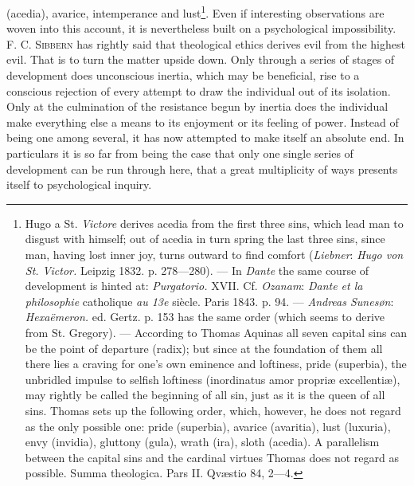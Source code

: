 \documentclass[12pt,a4paper,openany]{book}
\newcommand{\opage}[1]{\marginnote{\footnotesize\textit{[#1]}}}
\begin{document}
(acedia), avarice, intemperance and lust\footnote[2]{Hugo a St. \emph{Victore} derives acedia from the
first three sins, which lead man to disgust with himself; out of acedia in turn spring the last three
sins, since man, having lost inner joy, turns outward to find comfort (\emph{Liebner}: \textit{Hugo von
St. Victor.} Leipzig 1832. p. 278---280). --- In \emph{Dante} the same course of development is hinted at:
\textit{Purgatorio.} XVII. Cf. \emph{Ozanam}: \textit{Dante et la philosophie} catholique \textit{au 13e}
siècle. Paris 1843. p. 94. --- \emph{Andreas Sunesøn}: \textit{Hexaëmeron.} ed. Gertz. p. 153 has the same order
(which seems to derive from St. Gregory). --- According to Thomas Aquinas all seven capital sins can be
the point of departure (radix); but since at the foundation of them all there lies a craving for one's own
eminence and loftiness, pride (superbia), the unbridled impulse to selfish loftiness (inordinatus amor
propriæ excellentiæ), may rightly be called the beginning of all sin, just as it is the queen of all sins.
Thomas sets up the following order, which, however, he does not regard as the only possible one: pride
(superbia), avarice (avaritia), lust (luxuria), envy (invidia), gluttony (gula), wrath (ira), sloth
(acedia). A parallelism between the capital sins and the cardinal virtues Thomas does not regard as
possible. Summa theologica. Pars II. Qvæstio 84, 2---4.}. Even if interesting observations are woven
into this account,
\opage{130}it is nevertheless built on a psychological impossibility. F. C. \textsc{Sibbern} has rightly said that
theological ethics derives evil from the highest evil. That is to turn the matter upside down. Only
through a series of stages of development does unconscious inertia, which may be beneficial, rise to a
conscious rejection of every attempt to draw the individual out of its isolation. Only at the culmination
of the resistance begun by inertia does the individual make everything else a means to its enjoyment or
its feeling of power. Instead of being one among several, it has now attempted to make itself an absolute
end. In particulars it is so far from being the case that only one single series of development can be
run through here, that a great multiplicity of ways presents itself to psychological inquiry.
\end{document}
